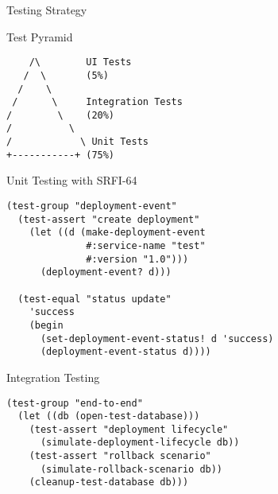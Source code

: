 \documentclass[presentation,aspectratio=169]{beamer}
\begin{document}
\begin{frame}[label={sec:org0914b78},fragile]{Testing Strategy}
 \begin{block}{Test Pyramid}
\begin{verbatim}
    /\        UI Tests
   /  \       (5%)
  /    \
 /      \     Integration Tests
/        \    (20%)
/          \
/            \ Unit Tests
+-----------+ (75%)
\end{verbatim}
\end{block}
\begin{block}{Unit Testing with SRFI-64}
\begin{verbatim}
(test-group "deployment-event"
  (test-assert "create deployment"
    (let ((d (make-deployment-event
              #:service-name "test"
              #:version "1.0")))
      (deployment-event? d)))

  (test-equal "status update"
    'success
    (begin
      (set-deployment-event-status! d 'success)
      (deployment-event-status d))))
\end{verbatim}
\end{block}
\begin{block}{Integration Testing}
\begin{verbatim}
(test-group "end-to-end"
  (let ((db (open-test-database)))
    (test-assert "deployment lifecycle"
      (simulate-deployment-lifecycle db))
    (test-assert "rollback scenario"
      (simulate-rollback-scenario db))
    (cleanup-test-database db)))
\end{verbatim}
\end{block}
\end{frame}
\end{document}
